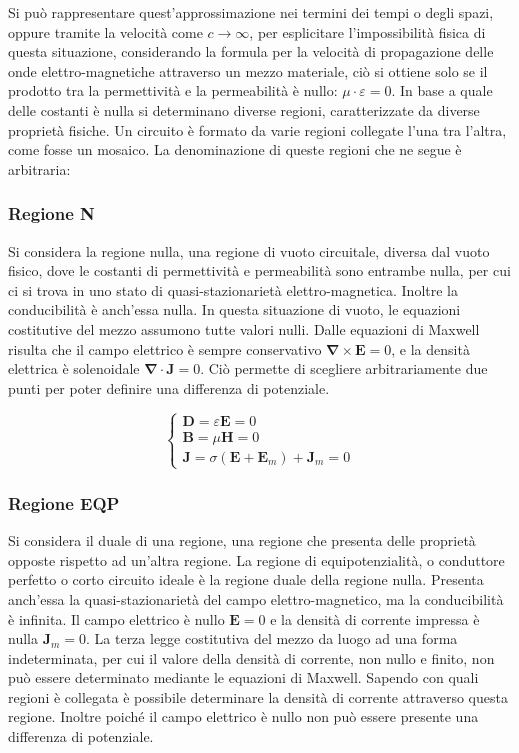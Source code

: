 \documentclass{article}
\newcommand{\vect}[1]{\boldsymbol{\mathbf{#1}}}
\numberwithin{equation}{subsection}
\begin{document}
Si può rappresentare quest'approssimazione 
nei termini dei tempi o degli spazi, oppure tramite la velocità come $c\to\infty$, per 
esplicitare l'impossibilità fisica di questa situazione, considerando la formula per la velocità di propagazione delle onde elettro-magnetiche attraverso un mezzo materiale, 
ciò si ottiene solo se il prodotto tra la permettività e la permeabilità è nullo: $\mu\cdot\varepsilon=0$. In base a quale delle costanti è nulla si determinano diverse 
regioni, caratterizzate da diverse proprietà fisiche. Un circuito è formato da varie regioni collegate l'una tra l'altra, come fosse un mosaico. 
La denominazione di queste regioni che ne segue è arbitraria:

\subsubsection{Regione N}
Si considera la regione nulla, una regione di vuoto circuitale, diversa dal vuoto fisico, dove le costanti di permettività e permeabilità sono entrambe nulla, per cui ci si 
trova in uno stato di quasi-stazionarietà elettro-magnetica. Inoltre la conducibilità è anch'essa nulla. In questa situazione di vuoto, le equazioni costitutive del mezzo 
assumono tutte valori nulli. Dalle equazioni di Maxwell risulta che il campo elettrico è sempre conservativo $\vect\nabla\times\vect{E}=0$, e la densità elettrica è solenoidale $\vect\nabla\cdot\vect{J}=0$. 
Ciò permette di scegliere arbitrariamente due punti per poter definire una differenza di potenziale. 

\begin{equation*}
    \begin{cases}
        \vect{D}=\varepsilon\vect{E}=0\\
        \vect{B}=\mu\vect{H}=0\\
        \vect{J}=\sigma(\vect{E}+\vect{E}_m)+\vect{J}_m=0
    \end{cases}
\end{equation*}

\subsubsection{Regione EQP}
Si considera il duale di una regione, una regione che presenta delle proprietà opposte rispetto ad un'altra regione. La regione di equipotenzialità, o conduttore perfetto o 
corto circuito ideale è la regione duale della regione nulla. Presenta anch'essa la quasi-stazionarietà del campo elettro-magnetico, ma la conducibilità è infinita. Il campo 
elettrico è nullo $\vect{E}=0$ e la densità di corrente impressa è nulla $\vect{J}_m=0$. La terza legge costitutiva del mezzo da 
luogo ad una forma indeterminata, per cui il valore della densità di corrente, non nullo e finito, non può essere determinato mediante le equazioni di Maxwell. Sapendo con 
quali regioni è collegata è possibile determinare la densità di corrente attraverso questa regione. Inoltre poiché il campo elettrico è nullo non può essere presente 
una differenza di potenziale. 
\end{document}
